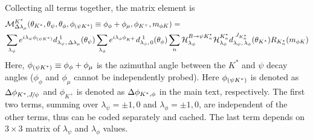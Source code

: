 Collecting all terms together, the matrix element is 
\begin{align}
\label{eq:KstAmplitude}
&{\mathcal{M}}_{\Delta\lambda_\mu}^{{K^*}}(\theta_{K^*},\theta_\psi,\theta_\phi, \phi_{(\psi{K^*})}\equiv\phi_{\phi}+ \phi_\mu,\phi_{K^+},m_{\phi K})= \notag\\
&\sum\limits_{\lambda_\psi} e^{i\lambda_{\psi}\phi_{(\psi{K^*})}}d^{\,\,1}_{\lambda_{\psi},\,\Delta\lambda_\mu}(\theta_{\psi})  \sum\limits_{\lambda_\phi}e^{i\lambda_{\phi}\phi_{{{K}^+}}}d^{\,\,1}_{\lambda_{\phi},\,0}(\theta_\phi) \sum\limits_n {\cal H}_{\lambda_\psi}^{B\rightarrow \psi K^*_n} {\cal H}^{K^*_n}_{\lambda_\phi}d^{\,\,J_{K^*_n}}_{\lambda_{\psi},\,\lambda_\phi}(\theta_{K^*}) R_{K^*_n}(m_{\phi K}) 
\end{align}
Here, $\phi_{(\psi{K^*})}\equiv\phi_{\phi}+ \phi_\mu$ is the azimuthal angle between the $K^*$ and $\psi$ decay angles
($\phi_{\phi}$ and $\phi_\mu$ cannot be independently probed). Here $\phi_{(\psi{K^*})}$ is denoted as $\Delta{\phi}_{{{K}^*},{{J\mskip -3mu/\mskip -2mu\psi}}}$ and $\phi_{K^+}$ is denoted as $\Delta{\phi}_{{{K}^*},\phi}$ in the main text, respectively. 
The first two terms, summing over $\lambda_\psi=\pm1,0$ and $\lambda_\phi=\pm1,0$, are independent of the other terms, thus can be coded  separately  and cached. The last term depends on $3\times3$ matrix of $\lambda_\psi$ and $\lambda_\phi$ values. 

